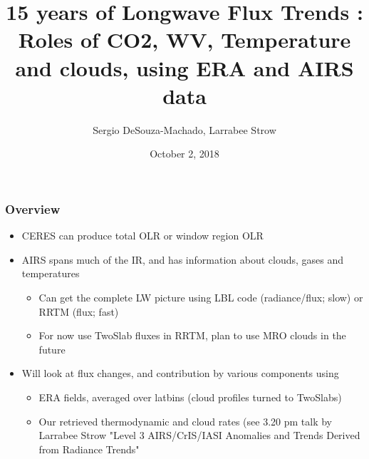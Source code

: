 \documentclass[10pt,t]{beamer}
\begin{document}
\title[]{15 years of Longwave Flux Trends : \newline
  Roles of CO2, WV, Temperature and clouds, \newline
  using ERA and AIRS data}
\author{Sergio DeSouza-Machado, Larrabee Strow}
\date{October 2, 2018}
\begin{frame}
  \titlepage
\end{frame}
\begin{frame}
  \frametitle{Overview}
  \begin{itemize}
  \item CERES can produce total OLR or window region OLR
  \item AIRS spans much of the IR, and has information about clouds, gases and temperatures
    \begin{itemize}
    \item Can get the complete LW picture using LBL code (radiance/flux; slow) or RRTM (flux; fast)
    \item For now use TwoSlab fluxes in RRTM, plan to use MRO clouds in the future
    \end{itemize}
  \item Will look at flux changes, and contribution by various components using
    \begin{itemize}
    \item ERA fields, averaged over latbins (cloud profiles turned to TwoSlabs)
    \item Our retrieved thermodynamic and cloud rates (see 3.20 pm talk by Larrabee Strow "Level 3
      AIRS/CrIS/IASI Anomalies and Trends Derived from Radiance Trends"
    \end{itemize}
  \end{itemize}
\end{frame}
\end{document}
